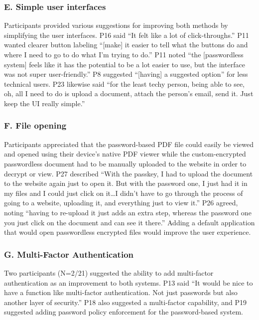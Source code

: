 \subsubsection*{E. Simple user interfaces}

Participants provided various suggestions for improving both methods by simplifying the user interfaces. P16 said ``It felt like a lot of click-throughs.'' P11 wanted clearer button labeling ``[make] it easier to tell what the buttons do and where I need to go to do what I'm trying to do.'' P11 noted ``the [passwordless system] feels like it has the potential to be a lot easier to use, but the interface was not super user-friendly.'' P8 suggested ``[having] a suggested option'' for less technical users. P23 likewise said ``for the least techy person, being able to see, oh, all I need to do is upload a document, attach the person's email, send it. Just keep the UI really simple.''

\subsubsection*{F. File opening}

Participants appreciated that the password-based PDF file could easily be viewed and opened using their device's native PDF viewer while the custom-encrypted passwordless document had to be manually uploaded to the website in order to decrypt or view. P27 described ``With the passkey, I had to upload the document to the website again just to open it. But with the password one, I just had it in my files and I could just click on it\ldots I didn't have to go through the process of going to a website, uploading it, and everything just to view it.'' P26 agreed, noting ``having to re-upload it just adds an extra step, whereas the password one you just click on the document and can see it there.'' Adding a default application that would open passwordless encrypted files would improve the user experience.

\subsubsection*{G. Multi-Factor Authentication}

Two participants (N=2/21) suggested the ability to add multi-factor authentication as an improvement to both systems. P13 said ``It would be nice to have a function like multi-factor authentication. Not just passwords but also another layer of security.'' P18 also suggested a multi-factor capability, and P19 suggested adding password policy enforcement for the password-based system.

